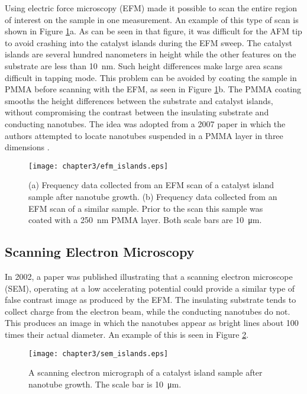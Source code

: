 Using electric force microscopy (EFM) made it possible to scan the entire region of interest on the sample in one measurement. An example of this type of scan is shown in Figure \ref{fig:efm_islands}a. As can be seen in that figure, it was difficult for the AFM tip to avoid crashing into the catalyst islands during the EFM sweep. The catalyst islands are several hundred nanometers in height while the other features on the substrate are less than \SI{10}{\nano\meter}. Such height differences make large area scans difficult in tapping mode. This problem can be avoided by coating the sample in PMMA before scanning with the EFM, as seen in Figure \ref{fig:efm_islands}b. The PMMA coating smooths the height differences between the substrate and catalyst islands, without compromising the contrast between the insulating substrate and conducting nanotubes. The idea was adopted from a 2007 paper in which the authors attempted to locate nanotubes suspended in a PMMA layer in three dimensions \cite{Jespersen2007}.

\begin{figure}
	\centering
	\texttt{[image: chapter3/efm\_islands.eps]}
	\caption{(a) Frequency data collected from an EFM scan of a catalyst island sample after nanotube growth. (b) Frequency data collected from an EFM scan of a similar sample. Prior to the scan this sample was coated with a \SI{250}{\nano\meter} PMMA layer. Both scale bars are \SI{10}{\micro\meter}. }
	\label{fig:efm_islands}
\end{figure}

\subsection{Scanning Electron Microscopy}

In 2002, a paper \cite{Brintlinger2002} was published illustrating that a scanning electron microscope (SEM), operating at a low accelerating potential could provide a similar type of false contrast image as produced by the EFM. The insulating substrate tends to collect charge from the electron beam, while the conducting nanotubes do not. This produces an image in which the nanotubes appear as bright lines about 100 times their actual diameter. An example of this is seen in Figure \ref{fig:sem_islands}. 

\begin{figure}
	\centering
	\texttt{[image: chapter3/sem\_islands.eps]}
	\caption{A scanning electron micrograph of a catalyst island sample after nanotube growth. The scale bar is \SI{10}{\micro\meter}.}
	\label{fig:sem_islands}
\end{figure}


